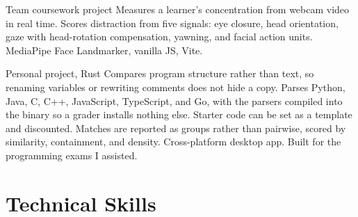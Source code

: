 \documentclass[small]{cv}
\begin{document}
  {Team coursework project}
  {}
  {Measures a learner's concentration from webcam video in real time. Scores distraction
   from five signals: eye closure, head orientation, gaze with head-rotation compensation,
   yawning, and facial action units. MediaPipe Face Landmarker, vanilla JS, Vite.}

  {Personal project, Rust}
  {}
  {Compares program structure rather than text, so renaming variables or rewriting
   comments does not hide a copy. Parses Python, Java, C, C++, JavaScript, TypeScript,
   and Go, with the parsers compiled into the binary so a grader installs nothing else.
   Starter code can be set as a template and discounted. Matches are reported as groups
   rather than pairwise, scored by similarity, containment, and density.
   Cross-platform desktop app. Built for the programming exams I assisted.}


\section{Technical Skills}

\end{document}
